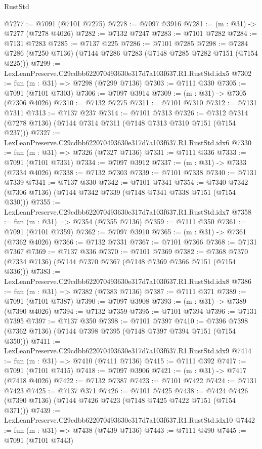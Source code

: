 \begin{lexlean}{RustStd}
\begin{coremodule}
@7277 := @7091 (@7101 @7275)
@7278 := @7097 @3916
@7281 := (m : @31) -> @7277 (@7278 @4026)
@7282 := @7132 @7247
@7283 := @7101 @7282
@7284 := @7131 @7283
@7285 := @7137 @225
@7286 := @7101 @7285
@7298 := @7284 @7286 (@7250 @7136) (@7144 @7286 @7283 (@7148 @7285 @7282 @7151 (@7154 @225)))
@7299 := LexLeanPreserve.C29cdbb622070493630e317d7a103f637.R1.RustStd.idx5
@7302 := fun (m : @31) => @7298 (@7299 @7136)
@7303 := @7111 @330
@7305 := @7091 (@7101 @7303)
@7306 := @7097 @3914
@7309 := (m : @31) -> @7305 (@7306 @4026)
@7310 := @7132 @7275
@7311 := @7101 @7310
@7312 := @7131 @7311
@7313 := @7137 @237
@7314 := @7101 @7313
@7326 := @7312 @7314 (@7278 @7136) (@7144 @7314 @7311 (@7148 @7313 @7310 @7151 (@7154 @237)))
@7327 := LexLeanPreserve.C29cdbb622070493630e317d7a103f637.R1.RustStd.idx6
@7330 := fun (m : @31) => @7326 (@7327 @7136)
@7331 := @7111 @336
@7333 := @7091 (@7101 @7331)
@7334 := @7097 @3912
@7337 := (m : @31) -> @7333 (@7334 @4026)
@7338 := @7132 @7303
@7339 := @7101 @7338
@7340 := @7131 @7339
@7341 := @7137 @330
@7342 := @7101 @7341
@7354 := @7340 @7342 (@7306 @7136) (@7144 @7342 @7339 (@7148 @7341 @7338 @7151 (@7154 @330)))
@7355 := LexLeanPreserve.C29cdbb622070493630e317d7a103f637.R1.RustStd.idx7
@7358 := fun (m : @31) => @7354 (@7355 @7136)
@7359 := @7111 @350
@7361 := @7091 (@7101 @7359)
@7362 := @7097 @3910
@7365 := (m : @31) -> @7361 (@7362 @4026)
@7366 := @7132 @7331
@7367 := @7101 @7366
@7368 := @7131 @7367
@7369 := @7137 @336
@7370 := @7101 @7369
@7382 := @7368 @7370 (@7334 @7136) (@7144 @7370 @7367 (@7148 @7369 @7366 @7151 (@7154 @336)))
@7383 := LexLeanPreserve.C29cdbb622070493630e317d7a103f637.R1.RustStd.idx8
@7386 := fun (m : @31) => @7382 (@7383 @7136)
@7387 := @7111 @371
@7389 := @7091 (@7101 @7387)
@7390 := @7097 @3908
@7393 := (m : @31) -> @7389 (@7390 @4026)
@7394 := @7132 @7359
@7395 := @7101 @7394
@7396 := @7131 @7395
@7397 := @7137 @350
@7398 := @7101 @7397
@7410 := @7396 @7398 (@7362 @7136) (@7144 @7398 @7395 (@7148 @7397 @7394 @7151 (@7154 @350)))
@7411 := LexLeanPreserve.C29cdbb622070493630e317d7a103f637.R1.RustStd.idx9
@7414 := fun (m : @31) => @7410 (@7411 @7136)
@7415 := @7111 @392
@7417 := @7091 (@7101 @7415)
@7418 := @7097 @3906
@7421 := (m : @31) -> @7417 (@7418 @4026)
@7422 := @7132 @7387
@7423 := @7101 @7422
@7424 := @7131 @7423
@7425 := @7137 @371
@7426 := @7101 @7425
@7438 := @7424 @7426 (@7390 @7136) (@7144 @7426 @7423 (@7148 @7425 @7422 @7151 (@7154 @371)))
@7439 := LexLeanPreserve.C29cdbb622070493630e317d7a103f637.R1.RustStd.idx10
@7442 := fun (m : @31) => @7438 (@7439 @7136)
@7443 := @7111 @490
@7445 := @7091 (@7101 @7443)

\end{coremodule}
\end{lexlean}
